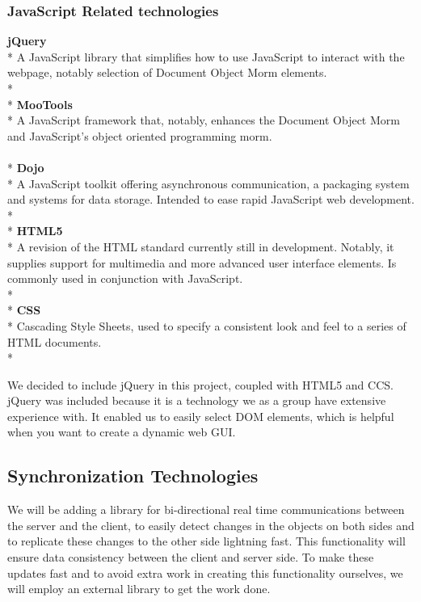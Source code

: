 \subsubsection{JavaScript Related technologies}

\textbf{jQuery}\\*
A JavaScript library that simplifies how to use JavaScript to interact with the webpage, notably selection of Document Object Morm elements.\\*
\\*
\textbf{MooTools}\\*
A JavaScript framework that, notably, enhances the Document Object Morm and JavaScript's object oriented programming morm.\\
\\*
\textbf{Dojo}\\*
A JavaScript toolkit offering asynchronous communication, a packaging system and systems for data storage. Intended to ease rapid JavaScript web development.\\*
\\*
\textbf{HTML5}\\*
A revision of the HTML standard currently still in development. Notably, it supplies support for multimedia and more advanced user interface elements. Is commonly used in conjunction with JavaScript.\\*
\\*
\textbf{CSS}\\*
Cascading Style Sheets, used to specify a consistent look and feel to a series of HTML documents.\\*

We decided to include jQuery in this project, coupled with HTML5 and CCS. jQuery was included because it is a technology we as a group have extensive experience with. It enabled us to easily select DOM elements, which is helpful when you want to create a dynamic web GUI.

\subsection{Synchronization Technologies}
We will be adding a library for bi-directional real time communications between the server and the client, to easily detect changes in the objects on both sides and to replicate these changes to the other side lightning fast. This functionality will ensure data consistency between the client and server side. To make these updates fast and to avoid extra work in creating this functionality ourselves, we will employ an external library to get the work done.

